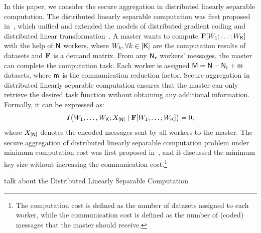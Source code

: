 \documentclass[conference,letterpaper]{IEEEtran}
\begin{document}
In this paper, we consider the secure aggregation in distributed linearly separable computation.
The distributed linearly separable computation was first proposed in~\cite{m=1}, which unified and extended the models of distributed gradient coding and distributed linear transformation~\cite{pmlr-v70-tandon17a,ye2018communication,Jahani2021OptimalCommunication-Computation,Short-dot}. A master wants to compute ${\bf F}[W_1; \ldots; W_{{\sf K}}]$ with the help of ${\sf N}$ workers, where 
$ W_k, \forall k \in [{\sf K}]$ are the computation results of datasets  and \( {\bf F} \) is a demand matrix. From any ${\sf N}_{\rm r}$ workers' messages, the master can complete the computation task. Each worker is assigned ${\sf M} = {\sf N} - {\sf N}_{\rm r} + {\sf m}$ datasets, where ${\sf m}$ is the communication reduction factor. Secure aggregation in distributed linearly separable computation ensures that the master can only retrieve the desired task function without obtaining any additional information. Formally, it can be expressed as:
\begin{align}
I\big(W_{1}, \ldots, W_{{\sf K}}; X_{[{\sf N}]} \mid {\bf F} [W_1; \ldots; W_{{\sf K}}] \big) = 0, \label{eq:security}
\end{align}
where \( X_{[{\sf N}]} \) denotes the encoded messages sent by all workers to the master. The secure aggregation of distributed linearly separable computation problem under minimum computation cost was first proposed in~\cite{wan2022secure}, and it discussed the minimum key size without increasing the communication cost.\footnote{The computation cost is defined as the number of datasets assigned to each worker, while the communication cost is defined as the number of (coded) messages that the master should receive.}   


\iffalse
{\red talk about the Distributed Linearly Separable Computation}
\end{document}
